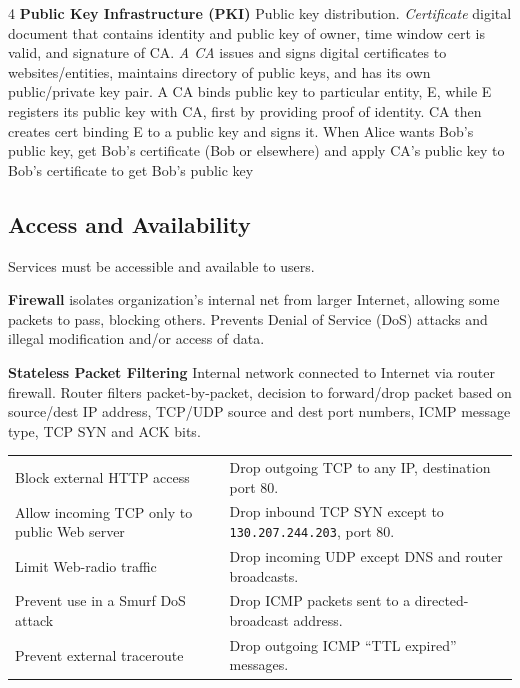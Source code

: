 \documentclass[10pt]{extarticle}
\begin{document}
\begin{multicols}{4}
\textbf{Public Key Infrastructure (PKI)}
Public key distribution.
\textit{Certificate } digital document that contains identity and public key of owner, time window cert is valid, and signature of CA.
\textit{A CA} issues and signs digital certificates to websites/entities, maintains directory of public keys, and has its own public/private key pair. A CA binds public key to particular entity, E, while E registers its public key with CA, first by providing proof of identity. CA then creates cert binding E to a public key and signs it.
When Alice wants Bob’s public key, get Bob’s certificate (Bob or elsewhere) and apply CA’s public key to Bob’s certificate to get Bob’s public key

\subsection{Access and Availability}
Services must be accessible and available to users.

\textbf{Firewall} isolates organization’s internal net from larger Internet, allowing some packets to pass, blocking others. Prevents Denial of Service (DoS) attacks and illegal modification and/or access of data.

\textbf{Stateless Packet Filtering} Internal network connected to Internet via router firewall. Router filters packet-by-packet, decision to forward/drop packet based on source/dest IP address, TCP/UDP source and dest port numbers, ICMP message type, TCP SYN and ACK bits.

\begin{center}
\begingroup
\renewcommand{\arraystretch}{1.02}
\setlength{\tabcolsep}{2pt}
\scriptsize
\begin{tabular}{|>{\raggedright\arraybackslash}p{.38\linewidth}|>{\raggedright\arraybackslash}p{.48\linewidth}|}
  \hline
  \multicolumn{1}{|c|}{\textbf{Policy}} &
  \multicolumn{1}{c|}{\textbf{Drop rule}} \\
  \hline
  Block external HTTP access & Drop outgoing TCP to any IP, destination port 80. \\
  \hline
  Allow incoming TCP only to public Web server & Drop inbound TCP SYN except to \texttt{130.207.244.203}, port 80. \\
  \hline
  Limit Web-radio traffic & Drop incoming UDP except DNS and router broadcasts. \\
  \hline
  Prevent use in a Smurf DoS attack & Drop ICMP packets sent to a directed-broadcast address. \\
  \hline
  Prevent external traceroute & Drop outgoing ICMP ``TTL expired'' messages. \\
  \hline
\end{tabular}
\endgroup
\end{center}


\end{multicols}
\end{document}
